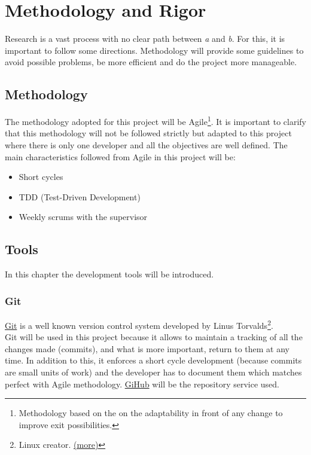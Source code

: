 \chapter{Methodology and Rigor} %

\label{Chapter4} %

Research is a vast process with no clear path between \emph{a} and \emph{b}. For this, it is important to follow some directions. Methodology will provide some guidelines to avoid possible problems, be more efficient and do the project more manageable. 

\section{Methodology}
The methodology adopted for this project will be Agile\footnote{Methodology based on the on the adaptability in front of any change to improve exit possibilities.}. It is important to clarify that this methodology will not be followed strictly but adapted to this project where there is only one developer and all the objectives are well defined. The main characteristics followed from Agile in this project will be:
\begin{itemize}
	\item Short cycles
	\item TDD (Test-Driven Development)
	\item Weekly scrums with the supervisor
\end{itemize}

\section{Tools}
In this chapter the development tools will be introduced. 
\subsection{Git}
\href{https://git-scm.com/}{Git} is a well known version control system developed by Linus Torvalds\footnote{Linux creator. \href{https://en.wikipedia.org/wiki/Linus_Torvalds}{(more)}}.\\
Git will be used in this project because it allows to maintain a tracking of all the changes made (commits), and what is more important, return to them at any time. In addition to this, it enforces a short cycle development (because commits are small units of work) and the developer has to document them which matches perfect with Agile methodology. \href{https://github.com}{GiHub} will be the repository service used.

